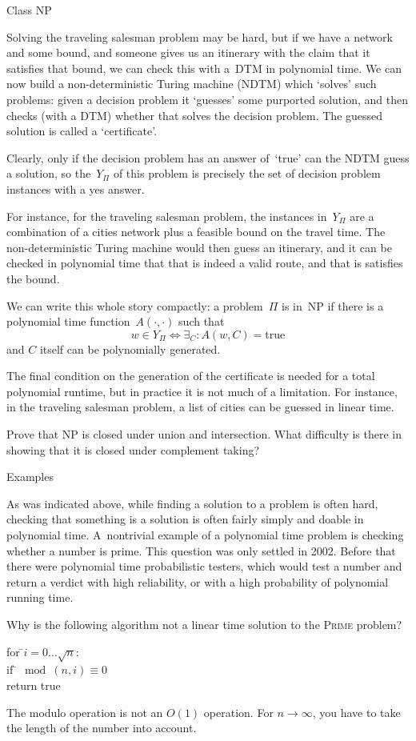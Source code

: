  {Class NP}

Solving the traveling salesman problem may be hard, but if we have a
network and some bound, and 
someone gives us an itinerary with the claim that it satisfies that
bound, we can check this with a~DTM in polynomial time. We can now
build a non-deterministic Turing machine (NDTM) which `solves' such
problems:
given a decision problem it `guesses' some
purported solution, and then checks (with a DTM) whether that solves
the decision problem.
The guessed solution is called a `certificate'.

Clearly, only if the decision problem has an answer of~`true' can the
NDTM guess a solution, so the~$Y_\Pi$ of this problem is precisely the
set of decision problem instances with a yes answer.

For instance, for the traveling salesman problem, the instances
in~$Y_\Pi$ are a combination of a cities network plus a feasible bound
on the travel time. The non-deterministic Turing machine would then
guess an itinerary, and it can be checked in polynomial time that that
is indeed a valid route, and that is satisfies the bound.

We can write this whole story compactly: a problem~$\Pi$ is in~NP if
there is a polynomial time function~$A(\cdot,\cdot)$ such that
\[ w\in Y_\Pi \Leftrightarrow \exists_C:A(w,C)=\mathrm{true} \]
and $C$ itself can be polynomially generated.

The final condition on the generation of the certificate is needed for
a total polynomial runtime, but in practice it is not much of a
limitation. For instance, in the traveling salesman problem, a list of
cities can be guessed in linear time.

\begin{594exercise}
Prove that NP is closed under union and intersection. What difficulty
is there in showing that it is closed under complement taking?
\end{594exercise}

 {Examples}

As was indicated above, while finding a solution to a problem is often
hard, checking that something is a solution is often fairly simply and
doable in polynomial time. A~nontrivial example of a polynomial time
problem is checking whether a number is prime. This question was only
settled in 2002. Before that there were polynomial time probabilistic
testers, which would test a number and return a verdict with high
reliability, or with a high probability of polynomial running time.
\begin{594exercise}
Why is the following algorithm not a linear time solution to the
\textsc{Prime} problem?
\begin{tabbing}
for \=$i=0\ldots\sqrt n$:\\
\>if \=$\mod(n,i)\equiv0$\\
\>\>return true
\end{tabbing}
\end{594exercise}
\begin{answer}
The modulo operation is not an $O(1)$ operation. For
$n\rightarrow\infty$, you have to take the length of the number into
account.
\end{answer}

